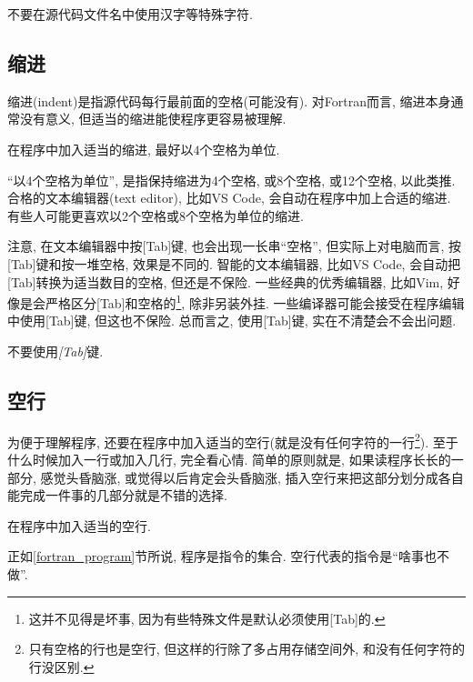 \begin{convention}
    不要在源代码文件名中使用汉字等特殊字符.
\end{convention}

\subsection{缩进}

缩进(indent)是指源代码每行最前面的空格(可能没有). 对Fortran而言, 缩进本身通常没有意义, 但适当的缩进能使程序更容易被理解.

\begin{convention}\label{fortran_indent}
    在程序中加入适当的缩进, 最好以$4$个空格为单位.
\end{convention}

``以4个空格为单位'', 是指保持缩进为4个空格, 或8个空格, 或12个空格, 以此类推. 合格的文本编辑器(text editor), 比如VS Code, 会自动在程序中加上合适的缩进. 有些人可能更喜欢以2个空格或8个空格为单位的缩进.

注意, 在文本编辑器中按[Tab]键, 也会出现一长串``空格'', 但实际上对电脑而言, 按[Tab]键和按一堆空格, 效果是不同的. 智能的文本编辑器, 比如VS Code, 会自动把[Tab]转换为适当数目的空格, 但还是不保险. 一些经典的优秀编辑器, 比如Vim, 好像是会严格区分[Tab]和空格的\footnote{
    这并不见得是坏事, 因为有些特殊文件是默认必须使用[Tab]的.
}, 除非另装外挂. 一些编译器可能会接受在程序编辑中使用[Tab]键, 但这也不保险. 总而言之, 使用[Tab]键, 实在不清楚会不会出问题.

\begin{convention}
    不要使用\emph{[Tab]}键.
\end{convention}

\subsection{空行}

为便于理解程序, 还要在程序中加入适当的空行(就是没有任何字符的一行\footnote{
    只有空格的行也是空行, 但这样的行除了多占用存储空间外, 和没有任何字符的行没区别.
}). 至于什么时候加入一行或加入几行, 完全看心情. 简单的原则就是, 如果读程序长长的一部分, 感觉头昏脑涨, 或觉得以后肯定会头昏脑涨, 插入空行来把这部分划分成各自能完成一件事的几部分就是不错的选择.

\begin{convention}
    在程序中加入适当的空行.
\end{convention}

正如\ref{fortran_program}节所说, 程序是指令的集合. 空行代表的指令是``啥事也不做''.

